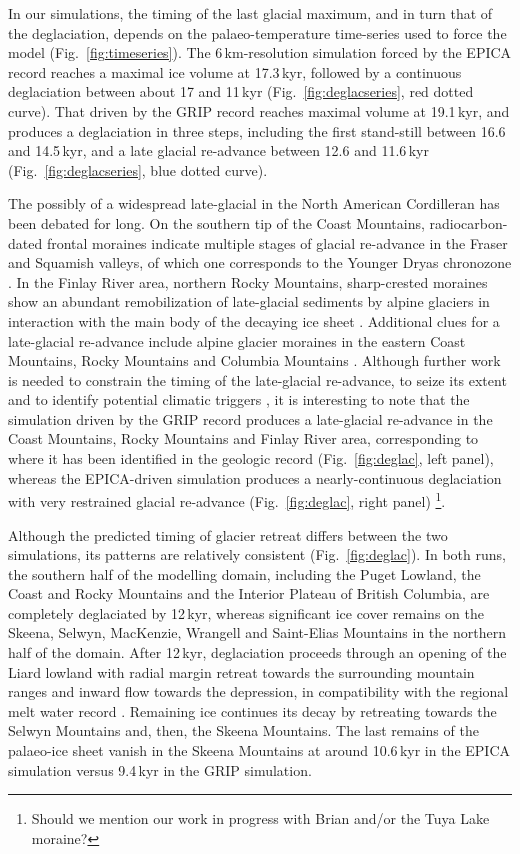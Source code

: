 \documentclass[tc, manuscript]{copernicus}
\begin{document}
In our simulations, the timing of the last glacial maximum, and in turn that of
the deglaciation, depends on the palaeo-temperature time-series used to force
the model (Fig.~\ref{fig:timeseries}). The
6\,km-resolution simulation forced by the EPICA record reaches a maximal
ice volume at 17.3\,kyr, followed by a continuous deglaciation between
about 17 and 11\,kyr (Fig.~\ref{fig:deglacseries}, red dotted curve).
That driven by the GRIP record reaches maximal
volume at 19.1\,kyr, and produces a deglaciation in three steps,
including the first stand-still between 16.6 and 14.5\,kyr, and a late
glacial re-advance between 12.6 and 11.6\,kyr (Fig.~\ref{fig:deglacseries},
blue dotted curve).

The possibly of a widespread late-glacial in
the North American Cordilleran has been debated for long. On the southern tip
of the Coast Mountains, radiocarbon-dated frontal moraines indicate multiple
stages of glacial re-advance in the Fraser and Squamish valleys, of which
one corresponds to the Younger Dryas chronozone \citep{Clague.etal.1997,
Friele.Clague.2002, Friele.Clague.2002a, Kovanen.2002,
Kovanen.Easterbrook.2002}. In the Finlay River area, northern Rocky Mountains,
sharp-crested moraines show an abundant remobilization of late-glacial
sediments by alpine glaciers in interaction with the main body of the decaying
ice sheet \citep{Lakeman.etal.2008}. Additional clues for a late-glacial
re-advance include alpine glacier moraines in the eastern Coast Mountains,
Rocky Mountains and Columbia Mountains \citep{Menounos.etal.2008}. Although
further work is needed to constrain the timing of the late-glacial re-advance,
to seize its extent and to identify potential climatic triggers
\citep{Menounos.etal.2008}, it is interesting to note that the simulation
driven by the GRIP record produces a late-glacial re-advance in the Coast
Mountains, Rocky Mountains and Finlay River area, corresponding to where it
has been identified in the geologic record (Fig.~\ref{fig:deglac}, left panel),
whereas the EPICA-driven simulation produces a nearly-continuous deglaciation
with very restrained glacial re-advance (Fig.~\ref{fig:deglac}, right panel)%
\footnote{Should we mention our work in progress with Brian and/or the Tuya
    Lake moraine?}.

Although the predicted timing of glacier retreat differs between the two
simulations, its patterns are relatively consistent (Fig.~\ref{fig:deglac}). In
both runs, the southern half of the modelling domain, including the Puget
Lowland, the Coast and Rocky Mountains and the Interior Plateau of British
Columbia, are completely deglaciated by 12\,kyr, whereas significant ice cover
remains on the Skeena, Selwyn, MacKenzie, Wrangell and Saint-Elias Mountains
in the northern half of the domain. After 12\,kyr, deglaciation proceeds
through an opening of the Liard lowland with radial margin retreat towards the
surrounding mountain ranges and inward flow towards the depression, in
compatibility with the regional melt water record \citep{Margold.etal.2013}.
Remaining ice continues its decay by retreating towards the Selwyn Mountains
and, then, the Skeena Mountains. The last remains of the palaeo-ice sheet
vanish in the Skeena Mountains at around 10.6\,kyr in the EPICA simulation
versus 9.4\,kyr in the GRIP simulation.
\end{document}

